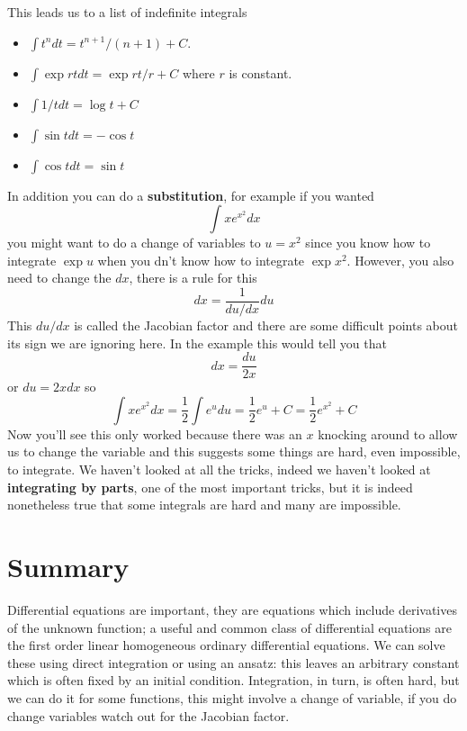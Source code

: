 \documentclass[12pt]{article}
\begin{document}
This leads us to a list of indefinite integrals
\begin{itemize}
\item $\int t^ndt =t^{n+1}/(n+1)+C$.
\item $\int \exp{rt}dt = \exp{rt}/r +C$ where $r$ is constant.
\item $\int 1/t{} dt = \log{t}+C$
\item $\int \sin{t} dt = -\cos{t}$
\item $\int \cos{t} dt = \sin{t}$
\end{itemize}

In addition you can do a \textbf{substitution}, for example if you wanted
\begin{equation}
  \int xe^{x^2}dx
\end{equation}
you might want to do a change of variables to $u=x^2$ since you know
how to integrate $\exp{u}$ when you dn't know how to integrate
$\exp{x^2}$. However, you also need to change the $dx$, there is a
rule for this
\begin{equation}
      dx=\frac{1}{du/dx}du
\end{equation}
This $du/dx$ is called the Jacobian factor and there are some
difficult points about its sign we are ignoring here. In the example
this would tell you that
\begin{equation}
  dx=\frac{du}{2x}
\end{equation}
or $du=2xdx$ so
\begin{equation}
  \int xe^{x^2}dx=\frac{1}{2}\int e^udu=\frac{1}{2}e^u+C=\frac{1}{2}e^{x^2}+C
\end{equation}
Now you'll see this only worked because there was an $x$ knocking
around to allow us to change the variable and this suggests some
things are hard, even impossible, to integrate. We haven't looked at
all the tricks, indeed we haven't looked at \textbf{integrating by
  parts}, one of the most important tricks, but it is indeed
nonetheless true that some integrals are hard and many are impossible.

\section*{Summary}

Differential equations are important, they are equations which include
derivatives of the unknown function; a useful and common class of
differential equations are the first order linear homogeneous ordinary
differential equations. We can solve these using direct integration or
using an ansatz: this leaves an arbitrary constant which is often
fixed by an initial condition. Integration, in turn, is often hard,
but we can do it for some functions, this might involve a change of
variable, if you do change variables watch out for the Jacobian
factor.
\end{document}
